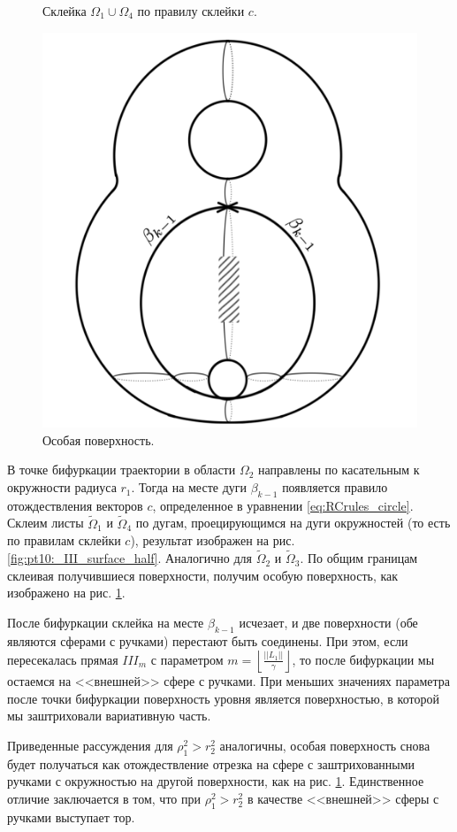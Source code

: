 \begin{figure}[!htb]
    \caption{Склейка $\Omega_1 \cup \Omega_4$ по правилу склейки $c$.}
    \label{fig:pt10:_III_surface_half}
\endminipage\hfill
{}
\centering
\includegraphics[scale=0.12]{images/ch4/section3_circular/atoms/III/surface.pdf}
    \caption{Особая поверхность.}
        \label{fig:pt10:_III_surface}
\endminipage\hfill
\end{figure}

В точке бифуркации траектории в области $\Omega_2$ направлены по касательным к окружности радиуса $r_1$. Тогда на месте дуги $\beta_{k-1}$ появляется правило отождествления векторов  $c$, определенное в уравнении \eqref{eq:RCrules_circle}. Склеим листы $\widetilde{\Omega}_1$ и $\widetilde{\Omega}_4$ по дугам, проецирующимся на дуги окружностей (то есть по правилам склейки $c$), результат изображен на рис. \ref{fig:pt10:_III_surface_half}. Аналогично для $\widetilde{\Omega}_2$ и $\widetilde{\Omega}_3$. По общим границам склеивая получившиеся поверхности, получим особую поверхность, как изображено на рис. \ref{fig:pt10:_III_surface}. 

После бифуркации склейка на месте $\beta_{k-1}$ исчезает, и две поверхности (обе являются сферами с ручками) перестают быть соединены. При этом, если пересекалась прямая $III_m$ с параметром $m=\left\lfloor \frac{||L_1||}{\gamma} \right\rfloor$, то после бифуркации мы остаемся на <<внешней>> сфере с ручками. При меньших значениях параметра после точки бифуркации поверхность уровня является поверхностью, в которой мы заштриховали вариативную часть.
 \begin{remark}
 Приведенные рассуждения для $\rho_1^2 > r_2^2$ аналогичны, особая поверхность снова будет получаться как отождествление отрезка на сфере с заштрихованными ручками с окружностью на другой поверхности, как на рис. \ref{fig:pt10:_III_surface}. Единственное отличие заключается в том, что при $\rho_1^2 > r_2^2$ в качестве <<внешней>> сферы с ручками выступает тор.
 \end{remark}
 

